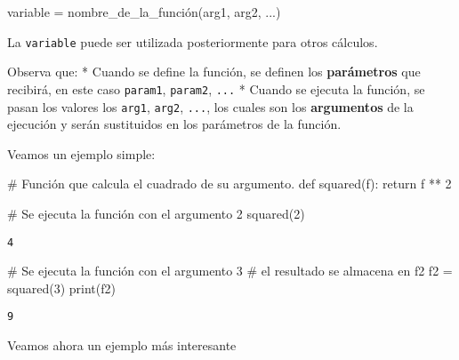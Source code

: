 \documentclass[
  letterpaper,
  DIV=11,
  numbers=noendperiod]{scrreprt}
\newenvironment{Shaded}{\begin{snugshade}}{\end{snugshade}}
\newcommand{\BuiltInTok}[1]{\textcolor[rgb]{0.00,0.23,0.31}{#1}}
\newcommand{\CommentTok}[1]{\textcolor[rgb]{0.37,0.37,0.37}{#1}}
\newcommand{\ControlFlowTok}[1]{\textcolor[rgb]{0.00,0.23,0.31}{#1}}
\newcommand{\DecValTok}[1]{\textcolor[rgb]{0.68,0.00,0.00}{#1}}
\newcommand{\KeywordTok}[1]{\textcolor[rgb]{0.00,0.23,0.31}{#1}}
\newcommand{\NormalTok}[1]{\textcolor[rgb]{0.00,0.23,0.31}{#1}}
\newcommand{\OperatorTok}[1]{\textcolor[rgb]{0.37,0.37,0.37}{#1}}
\begin{document}
\begin{Shaded}
\begin{Highlighting}[]
\NormalTok{variable }\OperatorTok{=}\NormalTok{ nombre\_de\_la\_función(arg1, arg2, ...)}
\end{Highlighting}
\end{Shaded}

La \texttt{variable} puede ser utilizada posteriormente para otros
cálculos.

Observa que: * Cuando se define la función, se definen los
\textbf{parámetros} que recibirá, en este caso \texttt{param1},
\texttt{param2}, \texttt{...} * Cuando se ejecuta la función, se pasan
los valores los \texttt{arg1}, \texttt{arg2}, \texttt{...}, los cuales
son los \textbf{argumentos} de la ejecución y serán sustituidos en los
parámetros de la función.

Veamos un ejemplo simple:

\begin{Shaded}
\begin{Highlighting}[]
\CommentTok{\# Función que calcula el cuadrado de su argumento.}
\KeywordTok{def}\NormalTok{ squared(f):}
    \ControlFlowTok{return}\NormalTok{ f }\OperatorTok{**} \DecValTok{2}
\end{Highlighting}
\end{Shaded}

\begin{Shaded}
\begin{Highlighting}[]
\CommentTok{\# Se ejecuta la función con el argumento 2}
\NormalTok{squared(}\DecValTok{2}\NormalTok{) }
\end{Highlighting}
\end{Shaded}

\begin{verbatim}
4
\end{verbatim}

\begin{Shaded}
\begin{Highlighting}[]
\CommentTok{\# Se ejecuta la función con el argumento 3}
\CommentTok{\# el resultado se almacena en f2}
\NormalTok{f2 }\OperatorTok{=}\NormalTok{ squared(}\DecValTok{3}\NormalTok{)}
\BuiltInTok{print}\NormalTok{(f2)}
\end{Highlighting}
\end{Shaded}

\begin{verbatim}
9
\end{verbatim}

Veamos ahora un ejemplo más interesante
\end{document}

